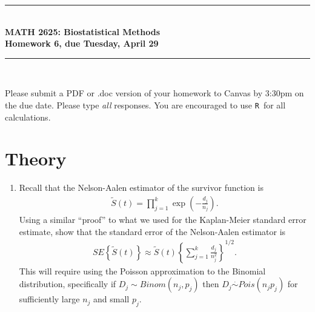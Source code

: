 \documentclass{article}
\newcommand{\HRule}{\rule{\linewidth}{0.5mm}}
\newcommand{\R}{\texttt{R}}
\begin{document}
	\begin{center}
		\HRule \\[0.1cm]
		\vspace{0.1cm}
		{ \LARGE \bfseries MATH 2625: Biostatistical Methods\\[0.5cm] Homework 6, due Tuesday, April 29 } \\[0.1cm]
		\HRule \\[0.1cm]
	\end{center}
	
		Please submit a PDF or .doc version of your homework to Canvas by 3:30pm on the due date. Please type \emph{all} responses. You are encouraged to use \R\ for all calculations.
		
	\section*{Theory}
	\begin{enumerate}
		\item Recall that the Nelson-Aalen estimator of the survivor function is
		\begin{align*}
			\tilde{S}(t) = \prod_{j=1}^k \exp{\left(-\frac{d_j}{n_j}\right)}.
		\end{align*}
		Using a similar ``proof'' to what we used for the Kaplan-Meier standard error estimate, show that the standard error of the Nelson-Aalen estimator is
		\begin{align*}
			SE\left\{ \tilde{S}(t) \right\} \approx \tilde{S}(t) \left\{ \sum_{j=1}^k \frac{d_j}{n_j^2} \right\}^{1/2}.
		\end{align*}
		This will require using the Poisson approximation to the Binomial distribution, specifically if $D_j \sim Binom(n_j, p_j)$ then $D_j \stackrel{\cdot}{\sim} Pois(n_j p_j)$ for sufficiently large $n_j$ and small $p_j$.
	\end{enumerate}
\end{document}
